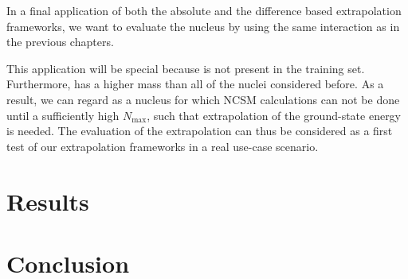 In a final application of both the absolute and the difference based extrapolation frameworks, we want to evaluate the nucleus  by using the same interaction as in the previous chapters.

This application will be special because  is not present in the training set. Furthermore,  has a higher mass than all of the nuclei considered before. As a result, we can regard  as a nucleus for which NCSM calculations can not be done until a sufficiently high $N_\mathrm{max}$, such that extrapolation of the ground-state energy is needed. The evaluation of the  extrapolation can thus be considered as a first test of our extrapolation frameworks in a real use-case scenario.
\section{Results}

\section{Conclusion}

